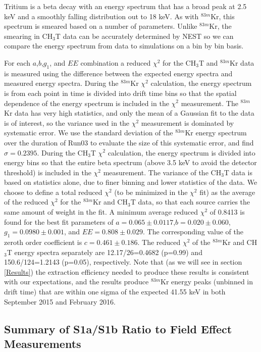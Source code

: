 \documentclass[a4paper,10pt,twocolumn]{article}
\begin{document}
Tritium is a beta decay with an energy spectrum that has a broad peak at 2.5 keV and a smoothly falling distribution out to 18 keV.  As with $^{83m}$Kr, this spectrum is smeared based on a number of parameters.  Unlike $^{83m}$Kr, the smearing in CH$_3$T data can be accurately determined by NEST so we can compare the energy spectrum from data to simulations on a bin by bin basis. 

For each $a$,$b$,$g_1$, and $EE$ combination a reduced $\chi^2$ for the CH$_3$T and $^{83m}$Kr data is measured using the difference between the expected energy spectra and measured energy spectra.   During the $^{83m}$Kr $\chi^2$ calculation, the energy spectrum is from each point in time is divided into drift time bins so that the spatial dependence of the energy spectrum is included in the $\chi^2$ measurement.  The $^{83m}$Kr data has very high statistics, and only the mean of a Gaussian fit to the data is of interest, so the variance used in the $\chi^2$  measurement  is dominated by systematic error.  We use the standard deviation of the $^{83m}$Kr energy spectrum over the duration of Run03 to evaluate the size of this systematic error, and find $\sigma = 0.2395$.  During the CH$_3$T $\chi^2$  calculation, the energy spectrum is divided into energy bins so that the entire beta spectrum (above 3.5 keV to avoid the detector threshold) is included in the $\chi^2$ measurement.  The variance of the CH$_3$T data is based on statistics alone, due to finer binning and lower statistics of the data.  We choose to define a total reduced $\chi^2$ (to be minimized in the $\chi^2$ fit) as the average of the reduced $\chi^2$ for the $^{83m}$Kr and CH$_3$T data, so that each source carries the same amount of weight in the fit. A minimum average reduced  $\chi^2$ of 0.8413 is found for the best fit parameters of $a=0.065 \pm 0.0117$,$b=0.020 \pm 0.060$,$g_1=0.0980 \pm 0.001$, and $EE=0.808 \pm 0.029$. The corresponding value of the zeroth order coefficient is $c=0.461 \pm 0.186$.  The reduced $\chi^2$ of the $^{83m}$Kr and CH$_3$T energy spectra separately are 12.17/26=0.4682 (p=0.99) and 150.6/124=1.2143 (p=0.05), respectively. Note that (as we will see in section \ref{Results}) the extraction efficiency needed to produce these results is consistent with our expectations, and the results produce $^{83m}$Kr energy peaks (unbinned in drift time) that are within one sigma of the expected 41.55 keV in both September 2015 and February 2016. 


\subsection{Summary of S1a/S1b Ratio to Field Effect Measurements}
\end{document}
